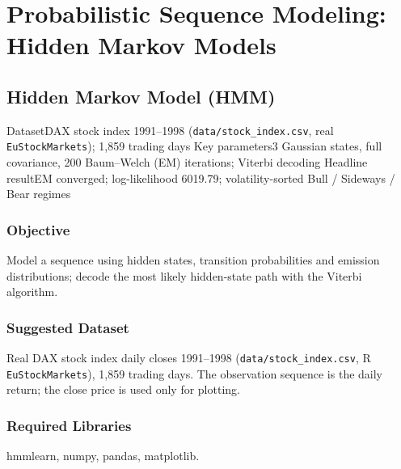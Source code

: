 
\part{Probabilistic Sequence Modeling: Hidden Markov Models}

\chapter{Hidden Markov Model (HMM)}\label{exp:16}


\quickfacts
  {Dataset}{DAX stock index 1991--1998 (\texttt{data/stock\_index.csv}, real \texttt{EuStockMarkets}); 1,859 trading days}
  {Key parameters}{3 Gaussian states, full covariance, 200 Baum--Welch (EM) iterations; Viterbi decoding}
  {Headline result}{EM converged; log-likelihood 6019.79; volatility-sorted Bull / Sideways / Bear regimes}

\section{Objective}
Model a sequence using hidden states, transition probabilities and emission distributions;
decode the most likely hidden-state path with the Viterbi algorithm.

\section{Suggested Dataset}
Real DAX stock index daily closes 1991--1998 (\texttt{data/stock\_index.csv}, R
\texttt{EuStockMarkets}), 1,859 trading days. The observation sequence is the daily return;
the close price is used only for plotting.

\section{Required Libraries}
hmmlearn, numpy, pandas, matplotlib.

